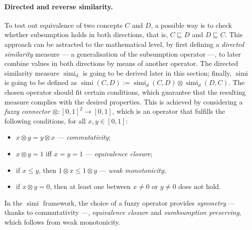 \documentclass[]{llncs}
\DeclareMathOperator{\simi}{simi}
\begin{document}
  \paragraph{Directed and reverse similarity.}
  To test out equivalence of two concepts \(C\) and \(D\), a possible way is to check whether subsumption holds in both directions, that is, \(C \sqsubseteq D\) and \(D \sqsubseteq C\).
  This approach can be astracted to the mathematical level, by first defining a \emph{directed similarity} measure --- a generalisation of the subsumption operator ---, to later combine values in both directions by means of another operator.
  The directed similarity measure \(\simi_d\) is going to be derived later in this section; finally, \(\simi\) is going to be defined as \(\simi(C,D) := \simi_d(C,D) \otimes \simi_d(D,C)\).
  The chosen operator should fit certain conditions, which guarantee that the resulting measure complies with the desired properties.
  This is achieved by considering a \emph{fuzzy connector} \(\otimes \colon {[0,1]}^2 \to [0,1]\), which is an operator that fulfills the following conditions, for all \(x, y \in [0,1]\):
  \begin{itemize}
    \item \(x \otimes y = y \otimes x\) --- \emph{commutativity};
    \item \(x \otimes y = 1\) iff \(x = y = 1\) --- \emph{equivalence closure};
    \item if \(x \le y\), then \(1 \otimes x \le 1 \otimes y\) --- \emph{weak monotonicity};
    \item if \(x \otimes y = 0\), then at least one between \(x \ne 0\) or \(y \ne 0\) does not hold.
  \end{itemize}
  In the \(\simi{}\) framework, the choice of a fuzzy operator provides \emph{symmetry} --- thanks to commutativity ---, \emph{equivalence closure} and \emph{sumbsumption preserving}, which follows from weak monotonicity.
\end{document}
